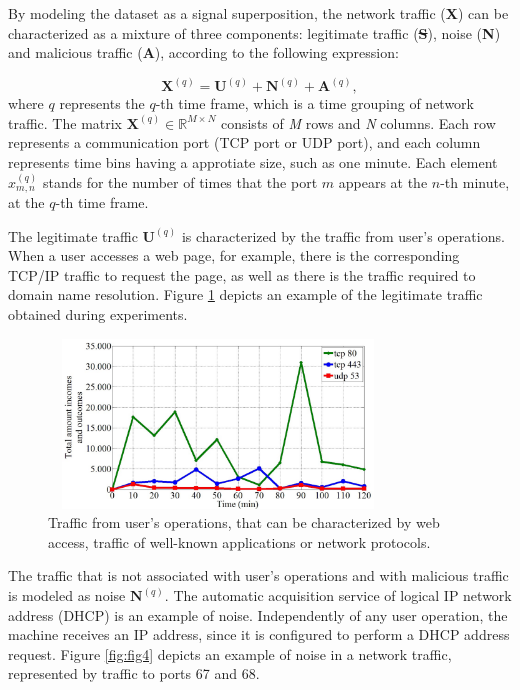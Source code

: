 \documentclass[review]{elsarticle}
\providecommand{\DIFaddtex}[1]{{\protect\color{blue}\uwave{#1}}} %
\providecommand{\DIFdeltex}[1]{{\protect\color{red}\sout{#1}}}                      %
\providecommand{\DIFaddbegin}{} %
\providecommand{\DIFaddend}{} %
\providecommand{\DIFdelbegin}{} %
\providecommand{\DIFdelend}{} %
\providecommand{\DIFadd}[1]{\texorpdfstring{\DIFaddtex{#1}}{#1}} %
\providecommand{\DIFdel}[1]{\texorpdfstring{\DIFdeltex{#1}}{}} %
\begin{document}
By modeling the dataset as a signal superposition, the network traffic (\textbf{X}) can be characterized as a mixture of three components: legitimate traffic (\textbf{\DIFdelbegin \DIFdel{S}\DIFdelend \DIFaddbegin \DIFadd{U}\DIFaddend }), noise (\textbf{N}) and malicious traffic (\textbf{A}), according to the following expression:

\begin{equation}\label{eq:eq01}
\boldsymbol{X}^{(q)} = \boldsymbol{U}^{(q)} + \boldsymbol{N}^{(q)} + \boldsymbol{A}^{(q)},
\end{equation}
where $q$ represents the $q$-th time frame, which is a time grouping of network traffic. The matrix $\boldsymbol{X}^{(q)} \in \mathbb{R}^{M \times N}$ consists of \emph{M} rows and \emph{N} columns. Each row represents a communication port (TCP port or UDP port), and each column represents time bins having a approtiate size, such as one minute. Each element $x_{m,n}^{(q)}$ stands for the number of times that the port $m$ appears at the $n$-th minute, at the $q$-th time frame.

The legitimate traffic $\boldsymbol{U}^{(q)}$ is characterized by the traffic from user's operations. When a user accesses a web page, for example, there is the corresponding TCP/IP traffic to request the page, as well as there is the traffic required to domain name resolution. Figure \ref{fig:fig3} depicts an example of the legitimate traffic obtained during experiments.

\begin{figure}[h!]
     \centering 
     \includegraphics[height=4.5cm, width=9cm]{results/figures/fig03.png}
     \caption{Traffic from user's operations, that can be characterized by web access, traffic of well-known applications or network protocols.}
     \label{fig:fig3}
\end{figure}

The traffic that is not associated with user's operations and with malicious traffic is modeled as noise $\boldsymbol{N}^{(q)}$. The automatic acquisition service of logical IP network address (DHCP) is an example of noise. Independently of any user operation, the machine receives an IP address, since it is configured to perform a DHCP address request. Figure \ref{fig:fig4} depicts an example of noise in a network traffic, represented by traffic to ports 67 and 68.
\end{document}

